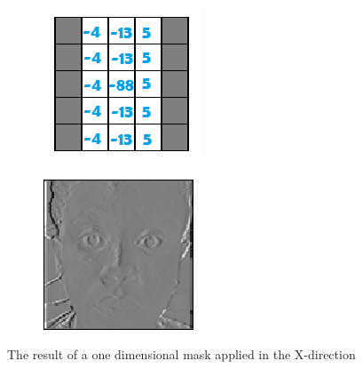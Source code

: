 \begin{figure}[H]
\centering
\begin{subfigure}{.5\textwidth}
  \centering
  \includegraphics[width=.5\linewidth]{gx}
  \label{fig:sub1}
\end{subfigure}%
\begin{subfigure}{.5\textwidth}
  \centering
  \includegraphics[width=.5\linewidth]{dx}
  \label{fig:sub2}
\end{subfigure}
\caption{The result of a one dimensional mask applied in the X-direction}
\label{fig:test}
\end{figure}
